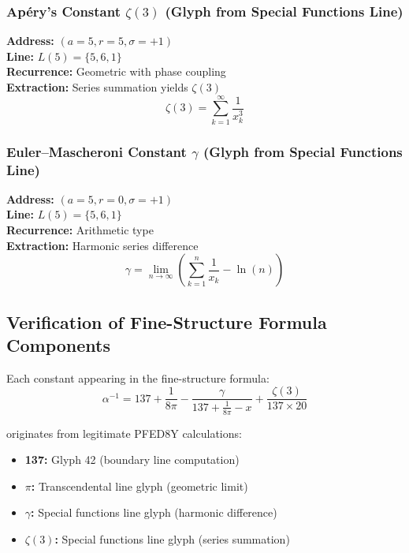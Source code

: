 \documentclass[pdflatex,sn-mathphys-num]{sn-jnl}
\theoremstyle{thmstyleone}
\theoremstyle{thmstyletwo}
\theoremstyle{thmstylethree}
\begin{document}
\subsubsection{Apéry's Constant $\zeta(3)$ (Glyph from Special Functions Line)}

\textbf{Address:} $(a = 5, r = 5, \sigma = +1)$ \\
\textbf{Line:} $L(5) = \{5, 6, 1\}$ \\
\textbf{Recurrence:} Geometric with phase coupling \\
\textbf{Extraction:} Series summation yields $\zeta(3)$
\begin{equation}
\zeta(3) = \sum_{k=1}^{\infty} \frac{1}{x_k^3}
\end{equation}

\subsubsection{Euler--Mascheroni Constant $\gamma$ (Glyph from Special Functions Line)}

\textbf{Address:} $(a = 5, r = 0, \sigma = +1)$ \\
\textbf{Line:} $L(5) = \{5, 6, 1\}$ \\
\textbf{Recurrence:} Arithmetic type \\
\textbf{Extraction:} Harmonic series difference
\begin{equation}
\gamma = \lim_{n \to \infty} \left( \sum_{k=1}^{n} \frac{1}{x_k} - \ln(n) \right)
\end{equation}

\subsection{Verification of Fine-Structure Formula Components}

Each constant appearing in the fine-structure formula:
\begin{equation}
\alpha^{-1} = 137 + \frac{1}{8\pi} - \frac{\gamma}{137 + \frac{1}{8\pi} - x} + \frac{\zeta(3)}{137 \times 20}
\end{equation}

originates from legitimate PFED8Y calculations:
\begin{itemize}
    \item \textbf{137:} Glyph 42 (boundary line computation)
    \item \textbf{$\pi$:} Transcendental line glyph (geometric limit)
    \item \textbf{$\gamma$:} Special functions line glyph (harmonic difference)
    \item \textbf{$\zeta(3)$:} Special functions line glyph (series summation)
\end{itemize}
\end{document}
